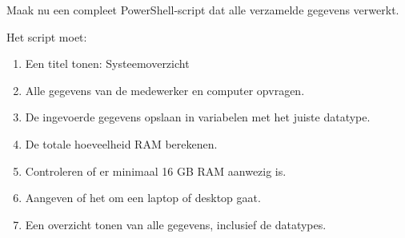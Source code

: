 
Maak nu een compleet PowerShell-script dat alle verzamelde gegevens verwerkt.

Het script moet:
\begin{enumerate}
\item Een titel tonen: Systeemoverzicht
\item Alle gegevens van de medewerker en computer opvragen.
\item De ingevoerde gegevens opslaan in variabelen met het juiste datatype.
\item De totale hoeveelheid RAM berekenen.
\item Controleren of er minimaal 16 GB RAM aanwezig is.
\item Aangeven of het om een laptop of desktop gaat.
\item Een overzicht tonen van alle gegevens, inclusief de datatypes.
\end{enumerate}

